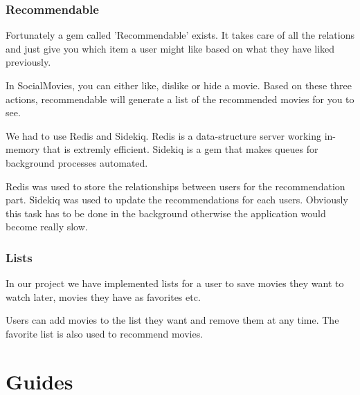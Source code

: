 \documentclass[12pt,a4paper]{article}
\begin{document}
\subsubsection{Recommendable}
Fortunately a gem called 'Recommendable' exists. It takes care of all the relations and just give you which item a user might like based on what they have liked previously.

In SocialMovies, you can either like, dislike or hide a movie. Based on these three actions, recommendable will generate a list of the recommended movies for you to see.

We had to use Redis and Sidekiq. Redis is a data-structure server working in-memory that is extremly efficient. Sidekiq is a gem that makes queues for background processes automated.

Redis was used to store the relationships between users for the recommendation part. Sidekiq was used to update the recommendations for each users. Obviously this task has to be done in the background otherwise the application would become really slow.

\subsubsection{Lists}
In our project we have implemented lists for a user to save movies they want to watch later, movies they have as favorites etc.

Users can add movies to the list they want and remove them at any time. The favorite list is also used to recommend movies.

\section{Guides}
\end{document}
